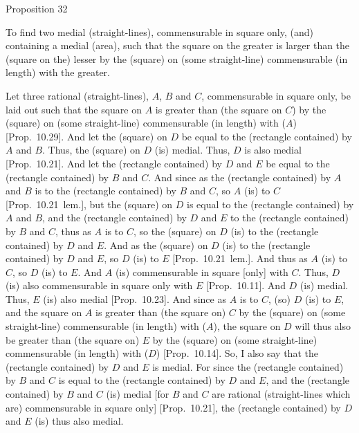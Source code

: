 
\begin{center}
{\large Proposition 32}
\end{center}

To find two medial (straight-lines), commensurable in square only, (and) containing a medial (area), such that
the square on the greater is larger than the (square on the) lesser by the
(square) on (some straight-line) commensurable (in length) with the greater.

\epsfysize=0.75in
\centerline{}

Let three rational (straight-lines), $A$, $B$ and $C$, commensurable
in square only, be laid out such that the square on $A$ is greater
than (the square on $C$) by the (square) on (some straight-line)
commensurable (in length) with ($A$) [Prop.~10.29].
And let the (square) on $D$ be equal to the (rectangle contained) by $A$ and
$B$. Thus, the (square) on $D$ (is) medial. Thus, $D$ is also
medial [Prop.~10.21].  And let the 
(rectangle contained) by $D$ and $E$ be equal to the (rectangle contained)
by $B$ and $C$. And since as the (rectangle contained) by $A$ and $B$
is to the (rectangle contained) by $B$ and $C$, so $A$ (is) to $C$
[Prop.~10.21~lem.], but the (square) on $D$
is equal to the (rectangle contained) by $A$ and $B$, and the
(rectangle contained) by $D$ and $E$ to the (rectangle contained) by
$B$ and $C$, thus as $A$ is to $C$, so the (square) on $D$ (is) to
the (rectangle contained) by $D$ and $E$. And as the (square) on $D$
(is) to the (rectangle contained) by $D$ and $E$, so $D$ (is) to $E$ [Prop.~10.21~lem.]. And thus as
$A$ (is) to $C$, so $D$ (is) to $E$. And $A$ (is) commensurable in square
[only] with $C$. Thus, $D$ (is) also commensurable in square only
with $E$ [Prop.~10.11]. And $D$ (is) medial.
Thus, $E$ (is) also medial [Prop.~10.23]. And
since as $A$ is to $C$, (so) $D$ (is) to $E$, and the square on $A$
is greater than (the square on) $C$ by the (square)
on (some straight-line) commensurable (in length) with ($A$),  the square on $D$
will thus also be greater than (the square on) $E$ by the (square) on (some straight-line)
commensurable (in length) with ($D$) [Prop.~10.14].
So, I also say that the (rectangle contained) by $D$ and $E$ is medial.
For since the (rectangle contained) by $B$ and $C$ is equal to the
(rectangle contained) by $D$ and $E$, and the (rectangle contained)
by $B$ and $C$ (is) medial [for $B$ and $C$ are rational
(straight-lines which are) commensurable in square only] [Prop.~10.21], the (rectangle contained) by $D$ and
$E$ (is) thus also medial.

